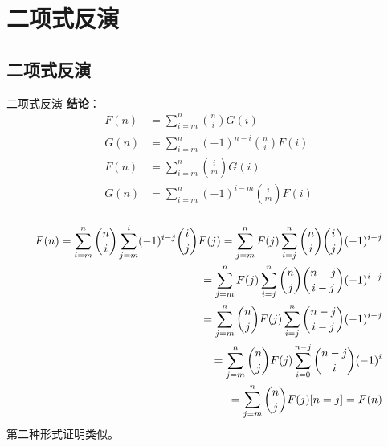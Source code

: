 \documentclass[UTF8]{beamer}
\begin{document}
  \section{二项式反演}
  \subsection{二项式反演}

    \begin{frame}
      \begin{block}{二项式反演}\label{ux4e8cux9879ux5f0fux53cdux6f14}
        \textbf{结论}： 
        \[
        \begin{aligned}
        F(n)&=\sum\limits_{i=m}^{n}{n \choose i}G(i) \\
        G(n)&=\sum\limits_{i=m}^{n}(-1)^{n-i}{n \choose i} F(i) \\
        F(n)&=\sum\limits_{i=m}^{n}{i \choose m}G(i) \\
        G(n)&=\sum\limits_{i=m}^{n}(-1)^{i-m}{i \choose m} F(i) \\
        \end{aligned}
        \]
      \end{block}
    \end{frame}

    \begin{frame}
      \[
      \begin{aligned}
      F(n)=\sum\limits_{i=m}^n\dbinom ni\sum\limits_{j=m}^i(-1)^{i-j}\dbinom ijF(j)=\sum\limits_{j=m}^nF(j)\sum\limits_{i=j}^n\dbinom ni\dbinom ij(-1)^{i-j} \\
      =\sum\limits_{j=m}^nF(j)\sum\limits_{i=j}^n\dbinom nj\dbinom {n-j}{i-j}(-1)^{i-j} \\
      =\sum\limits_{j=m}^n\dbinom nj F(j)\sum\limits_{i=j}^n\dbinom {n-j}{i-j}(-1)^{i-j} \\
      =\sum\limits_{j=m}^n\dbinom nj F(j)\sum\limits_{i=0}^{n-j}\dbinom {n-j}{i}(-1)^{i} \\
      =\sum\limits_{j=m}^n\dbinom nj F(j)[n=j]=F(n)
      \end{aligned}
      \]
      第二种形式证明类似。
    \end{frame}
\end{document}
